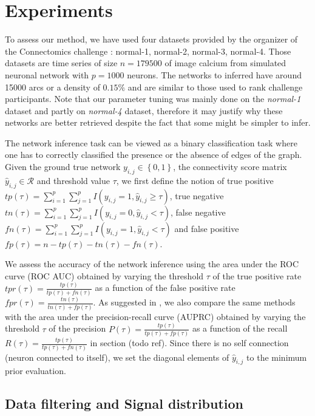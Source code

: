 \documentclass[wcp]{jmlr}
\begin{document}
\section{Experiments}

To assess our method, we have used four datasets provided by the organizer
of the Connectomics challenge : normal-1, normal-2, normal-3, normal-4. Those
datasets are time series of size $n=179500$ of image calcium from simulated
neuronal network \cite{stetter2012model} with $p=1000$ neurons. The networks
to inferred have around 15000 arcs or a density of $0.15\%$ and are similar to those
used to rank challenge participants. Note that our parameter tuning was mainly
done on the \textit{normal-1} dataset and partly on \textit{normal-4} dataset,
therefore it may justify why these networks are better retrieved despite the
fact that some might be simpler to infer.

The network inference task can be viewed as a binary classification task
where one has to correctly classified the presence or the absence of edges
of the graph. Given the ground true network $y_{i,j} \in \left\{0, 1\right\}$,
the connectivity score matrix $\hat{y}_{i,j} \in \mathcal{R}$
and threshold value $\tau$, we first define the notion of
true positive $tp(\tau) = \sum_{i=1}^p \sum_{j=1}^p I(y_{i,j} = 1, \hat{y}_{i,j} \geq \tau)$,
true negative $tn(\tau) = \sum_{i=1}^p \sum_{j=1}^p I(y_{i,j} = 0, \hat{y}_{i,j} < \tau)$,
false negative $fn(\tau) = \sum_{i=1}^p \sum_{j=1}^p I(y_{i,j} = 1, \hat{y}_{i,j} < \tau)$ and
false positive $fp(\tau) = n - tp(\tau) - tn(\tau) -fn(\tau)$.

We assess the accuracy of the network inference using the area under
the ROC curve (ROC AUC) obtained by varying the threshold
$\tau$ of the true positive rate $tpr(\tau) = \frac{tp(\tau)}{tp(\tau) + fn(\tau)}$
as a function of the false positive rate
$fpr(\tau) = \frac{tn(\tau)}{tn(\tau) + fp(\tau)}$.  As suggested in
\cite{schrynemackers2013protocols},
we also compare the same methods with the area under the precision-recall
curve (AUPRC) obtained by varying the threshold
$\tau$ of the precision $P(\tau) = \frac{tp(\tau)}{tp(\tau) + fp(\tau)}$
as a function of the recall $R(\tau) = \frac{tp(\tau)}{tp(\tau) + fn(\tau)}$
in section (todo ref).
Since  there is no self connection (neuron connected to itself), we set
the diagonal elements of $\hat{y}_{i,j}$ to the minimum prior evaluation.

\subsection{Data filtering and Signal distribution}
\end{document}
